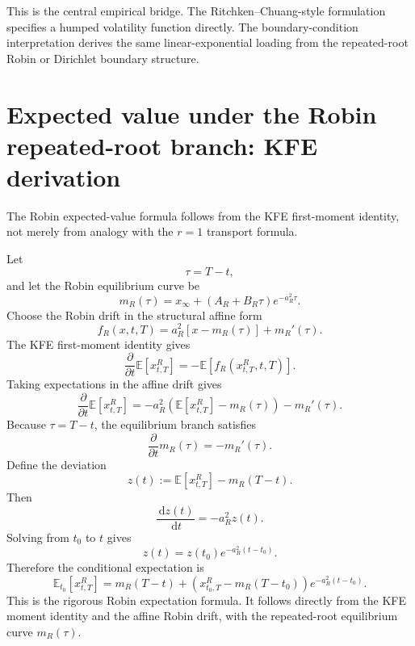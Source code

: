 \documentclass[11pt]{article}
\newcommand{\E}{\mathbb{E}}
\newcommand{\dd}{\,\mathrm{d}}
\numberwithin{equation}{section}
\begin{document}
This is the central empirical bridge. The Ritchken--Chuang-style formulation specifies a humped volatility function directly. The boundary-condition interpretation derives the same linear-exponential loading from the repeated-root Robin or Dirichlet boundary structure.

\section{Expected value under the Robin repeated-root branch: KFE derivation}

The Robin expected-value formula follows from the KFE first-moment identity, not merely from analogy with the $r=1$ transport formula.

Let
\begin{equation}
\tau=T-t,
\end{equation}
and let the Robin equilibrium curve be
\begin{equation}
m_R(\tau)=x_\infty+(A_R+B_R\tau)e^{-a_R^2\tau}.
\end{equation}
Choose the Robin drift in the structural affine form
\begin{equation}
f_R(x,t,T)=a_R^2\left[x-m_R(\tau)\right]+m_R'(\tau).
\end{equation}
The KFE first-moment identity gives
\begin{equation}
\frac{\partial}{\partial t}\E[x^R_{t,T}]
=-\E[f_R(x^R_{t,T},t,T)].
\end{equation}
Taking expectations in the affine drift gives
\begin{equation}
\frac{\partial}{\partial t}\E[x^R_{t,T}]
=-a_R^2\left(\E[x^R_{t,T}]-m_R(\tau)\right)-m_R'(\tau).
\end{equation}
Because $\tau=T-t$, the equilibrium branch satisfies
\begin{equation}
\frac{\partial}{\partial t}m_R(\tau)=-m_R'(\tau).
\end{equation}
Define the deviation
\begin{equation}
z(t):=\E[x^R_{t,T}]-m_R(T-t).
\end{equation}
Then
\begin{equation}
\frac{\dd z(t)}{\dd t}
=-a_R^2z(t).
\end{equation}
Solving from $t_0$ to $t$ gives
\begin{equation}
z(t)=z(t_0)e^{-a_R^2(t-t_0)}.
\end{equation}
Therefore the conditional expectation is
\begin{equation}
\label{eq:robin-expectation}
\E_{t_0}[x^R_{t,T}]
=
 m_R(T-t)
+
\left(x^R_{t_0,T}-m_R(T-t_0)\right)e^{-a_R^2(t-t_0)}.
\end{equation}
This is the rigorous Robin expectation formula. It follows directly from the KFE moment identity and the affine Robin drift, with the repeated-root equilibrium curve $m_R(\tau)$.
\end{document}
